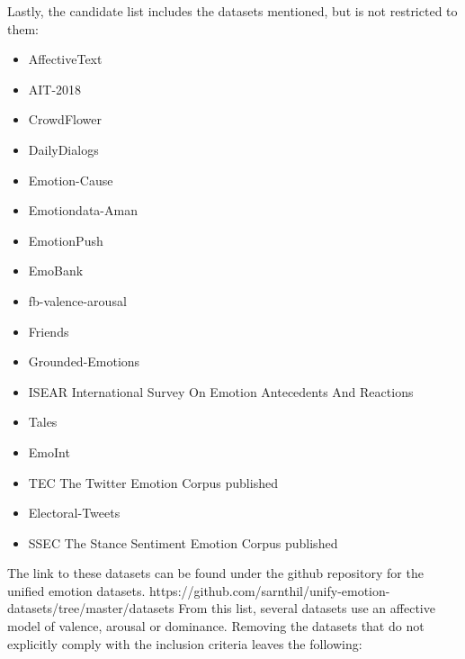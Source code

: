 Lastly, the candidate list includes the datasets mentioned, but is not restricted to them:
\begin{itemize}
  \item AffectiveText~\cite{strapparava2007semeval} %
  \item AIT-2018~\cite{SemEval2018Task1} %
  \item CrowdFlower %
  \item DailyDialogs~\cite{li2017dailydialog} %
  \item Emotion-Cause~\cite{ghazi2015detecting} %
  \item Emotiondata-Aman~\cite{aman2007recognizing} %
  \item EmotionPush~\cite{huang2018emotionpush} %
  \item EmoBank~\cite{buechel2017emobank} %
  \item fb-valence-arousal~\cite{preoctiuc2016modelling} %
  \item Friends~\cite{chen2018emotionlines} %
  \item Grounded-Emotions~\cite{liu2017grounded} %
  \item ISEAR International Survey On Emotion Antecedents And Reactions~\cite{scherer1990international} %
  \item Tales~\cite{alm2005emotions} %
  \item EmoInt \cite{MohammadB17starsem} %
  \item TEC The Twitter Emotion Corpus published \cite{mohammad2012emotional} %
  \item Electoral-Tweets \cite{mohammad2014semantic} %
  \item SSEC The Stance Sentiment Emotion Corpus published \cite{schuff2017annotation} %
\end{itemize}
The link to these datasets can be found under the github repository for the unified emotion datasets.
https://github.com/sarnthil/unify-emotion-datasets/tree/master/datasets
From this list, several datasets use an affective model of valence, arousal or dominance. Removing the datasets that do not explicitly comply with the inclusion criteria leaves the following:

